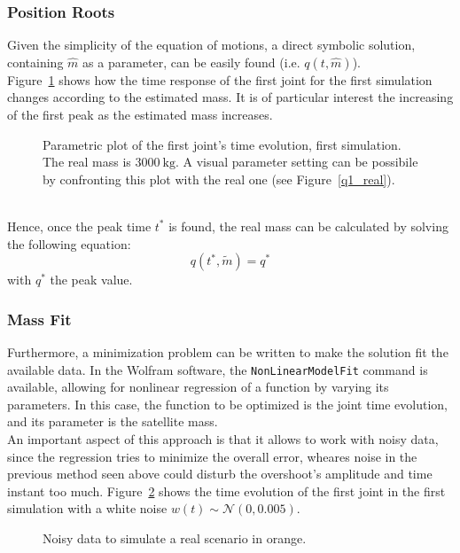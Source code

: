 \documentclass[a4paper,12pt,oneside]{report}
\begin{document}
\subsubsection{Position Roots}
Given the simplicity of the equation of motions, a direct symbolic solution, containing $\hat{m}$ as a parameter, can be easily found (i.e. $q(t,\hat{m})$).\\
Figure~\ref{parametric_plot} shows how the time response of the first joint for the first simulation changes according to the estimated mass. It is of particular interest the increasing of the first peak as the estimated mass increases.
\begin{figure}[h]
  \centering
  
  \caption{Parametric plot of the first joint's time evolution, first simulation. The real mass is $\SI{3000}{\kilogram}$. A visual parameter setting can be possibile by confronting this plot with the real one (see Figure~\ref{q1_real}).}
  \label{parametric_plot}
\end{figure}\\
Hence, once the peak time $t^*$ is found, the real mass can be calculated by solving the following equation:
\begin{equation}
  q(t^*,\tilde{m})=q^*
\end{equation}
with $q^*$ the peak value.
\subsubsection{Mass Fit}
Furthermore, a minimization problem can be written to make the solution fit the available data. In the Wolfram software, the \texttt{NonLinearModelFit} command is available, allowing for nonlinear regression of a function by varying its parameters. In this case, the function to be optimized is the joint time evolution, and its parameter is the satellite mass.\\
An important aspect of this approach is that it allows to work with noisy data, since the regression tries to minimize the overall error, wheares noise in the previous method seen above could disturb the overshoot's amplitude and time instant too much. Figure~\ref{noise} shows the time evolution of the first joint in the first simulation with a white noise $w(t)\sim \mathcal{N} (0,0.005)$.
\begin{figure}[h]
  \centering
  
  \caption{Noisy data to simulate a real scenario in orange.}
  \label{noise}
\end{figure}
\newpage
\end{document}
